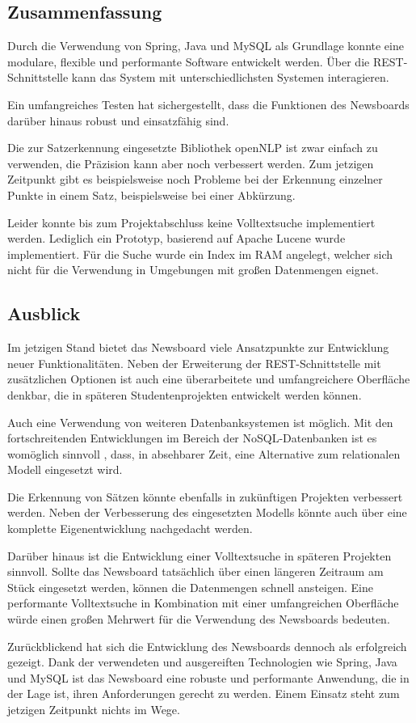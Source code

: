 \subsection{Zusammenfassung}
Durch die Verwendung von Spring, Java und MySQL als Grundlage konnte eine modulare, flexible
und performante Software entwickelt werden. Über die REST-Schnittstelle kann das System
mit unterschiedlichsten Systemen interagieren. 

Ein umfangreiches Testen hat sichergestellt, dass die Funktionen des Newsboards darüber hinaus
robust und einsatzfähig sind.

Die zur Satzerkennung eingesetzte Bibliothek openNLP ist zwar einfach zu
verwenden, die Präzision kann aber noch verbessert werden. Zum jetzigen Zeitpunkt gibt es 
beispielsweise noch Probleme bei der Erkennung einzelner Punkte in einem Satz, beispielsweise
bei einer Abkürzung.

Leider konnte bis zum Projektabschluss keine Volltextsuche implementiert werden. Lediglich ein
Prototyp, basierend auf Apache Lucene wurde implementiert. Für die Suche wurde ein Index
im RAM angelegt, welcher sich nicht für die Verwendung in Umgebungen mit großen Datenmengen
eignet.

\subsection{Ausblick} 
Im jetzigen Stand bietet das Newsboard viele Ansatzpunkte zur Entwicklung neuer 
Funktionalitäten. Neben der Erweiterung der REST-Schnittstelle mit zusätzlichen Optionen ist 
auch eine überarbeitete und umfangreichere Oberfläche denkbar, die in späteren 
Studentenprojekten entwickelt werden können.

Auch eine Verwendung von weiteren Datenbanksystemen ist möglich. Mit den fortschreitenden
Entwicklungen im Bereich der NoSQL-Datenbanken ist es womöglich sinnvoll , dass, in absehbarer
Zeit, eine Alternative zum relationalen Modell eingesetzt wird. 

Die Erkennung von Sätzen könnte ebenfalls in zukünftigen Projekten verbessert werden. Neben
der Verbesserung des eingesetzten Modells könnte auch über eine komplette Eigenentwicklung
nachgedacht werden.

Darüber hinaus ist die Entwicklung einer Volltextsuche in späteren Projekten sinnvoll. Sollte
das Newsboard tatsächlich über einen längeren Zeitraum am Stück eingesetzt werden, können
die Datenmengen schnell ansteigen. Eine performante Volltextsuche in Kombination mit einer
umfangreichen Oberfläche würde einen großen Mehrwert für die Verwendung des Newsboards
bedeuten.

Zurückblickend hat sich die Entwicklung des Newsboards dennoch als erfolgreich gezeigt.
Dank der verwendeten und ausgereiften Technologien wie Spring, Java und MySQL ist das
Newsboard eine robuste und performante Anwendung, die in der Lage ist, ihren Anforderungen
gerecht zu werden. Einem Einsatz steht zum jetzigen Zeitpunkt nichts im Wege.